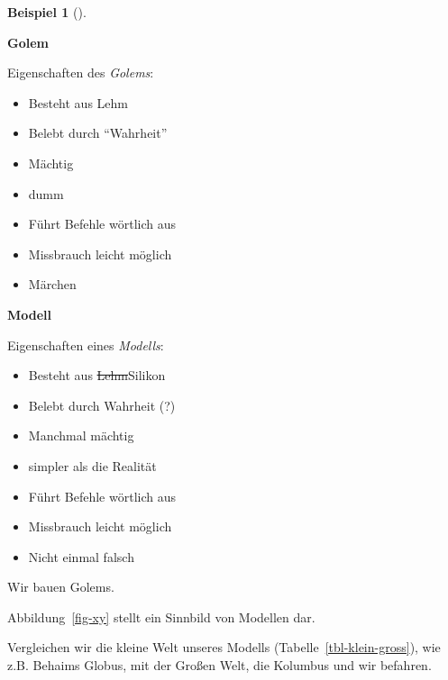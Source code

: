 \documentclass[
  ngerman,
  letterpaper,
  twoside,
  open=any]{scrbook}
\providecommand{\tightlist}{%
  \setlength{\itemsep}{0pt}\setlength{\parskip}{0pt}}\usepackage{longtable,booktabs,array}
\theoremstyle{definition}
\newtheorem{example}{Beispiel}[chapter]
\theoremstyle{plain}
\theoremstyle{definition}
\theoremstyle{definition}
\theoremstyle{remark}
\begin{document}
\begin{example}[]
\begin{figure}[H]
\end{figure}%

\textbf{Golem}

Eigenschaften des \emph{Golems}:

\begin{itemize}
\tightlist
\item
  Besteht aus Lehm
\item
  Belebt durch \enquote{Wahrheit}
\item
  Mächtig
\item
  dumm
\item
  Führt Befehle wörtlich aus
\item
  Missbrauch leicht möglich
\item
  Märchen
\end{itemize}

\textbf{Modell}

Eigenschaften eines \emph{Modells}:

\begin{itemize}
\tightlist
\item
  Besteht aus \st{Lehm}Silikon
\item
  Belebt durch Wahrheit (?)
\item
  Manchmal mächtig
\item
  simpler als die Realität
\item
  Führt Befehle wörtlich aus
\item
  Missbrauch leicht möglich
\item
  Nicht einmal falsch
\end{itemize}

\begin{tcolorbox}[enhanced jigsaw, arc=.35mm, bottomrule=.15mm, bottomtitle=1mm, breakable, colback=white, colbacktitle=quarto-callout-note-color!10!white, colframe=quarto-callout-note-color-frame, coltitle=black, left=2mm, leftrule=.75mm, opacityback=0, opacitybacktitle=0.6, rightrule=.15mm, title=\textcolor{quarto-callout-note-color}{\faInfo}\hspace{0.5em}{Hinweis}, titlerule=0mm, toprule=.15mm, toptitle=1mm]

Wir bauen Golems.

\end{tcolorbox}

Abbildung~\ref{fig-xy} stellt ein Sinnbild von Modellen dar.

Vergleichen wir die kleine Welt unseres Modells
(Tabelle~\ref{tbl-klein-gross}), wie z.B. Behaims Globus, mit der Großen
Welt, die Kolumbus und wir befahren.


\end{example}
\end{document}
